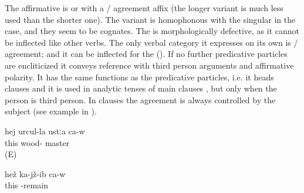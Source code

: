 The affirmative  is  or  with a / agreement affix (the longer variant is much less used than the shorter one). The variant  is homophonous with the singular  in the  case, and they seem to be cognates. The  is morphologically defective, as it cannot be inflected like other verbs. The only verbal category it expresses on its own is / agreement; and it can be inflected for the  (). If no further predicative particles are encliticized it conveys  reference with third person arguments and affirmative polarity. It has the same functions as the predicative particles, i.e. it heads  clauses  and it is used in analytic tenses of main clauses , but only when the person  is third person. In  clauses the agreement is always controlled by the subject (see example  in ).
%
\begin{exe}
	\ex	\label{ex:He is a carpenter}
	\gll	hej	urcul-la	ustːa	ca-w\\
		this	wood-	master	\\
	\glt	{} (E)

	\ex	\label{ex:He is sitting}
	\gll	hež	ka-jž-ib	ca-w\\
		this	-remain	\\
	\glt	{}
\end{exe}

